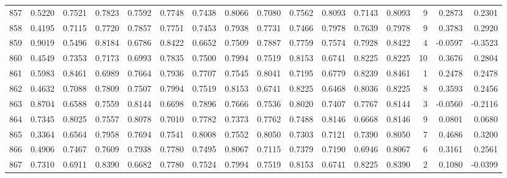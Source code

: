 \begin{tabular}{lrrrrrrrrrrrrrrr}
857 &      0.5220 &  0.7521 &  0.7823 &  0.7592 &  0.7748 &  0.7438 &  0.8066 &  0.7080 &  0.7562 &  0.8093 &   0.7143 &     0.8093 &      9 &                    0.2873 &                     0.2301 \\
858 &      0.4195 &  0.7115 &  0.7720 &  0.7857 &  0.7751 &  0.7453 &  0.7938 &  0.7731 &  0.7466 &  0.7978 &   0.7639 &     0.7978 &      9 &                    0.3783 &                     0.2920 \\
859 &      0.9019 &  0.5496 &  0.8184 &  0.6786 &  0.8422 &  0.6652 &  0.7509 &  0.7887 &  0.7759 &  0.7574 &   0.7928 &     0.8422 &      4 &                   -0.0597 &                    -0.3523 \\
860 &      0.4549 &  0.7353 &  0.7173 &  0.6993 &  0.7835 &  0.7500 &  0.7994 &  0.7519 &  0.8153 &  0.6741 &   0.8225 &     0.8225 &     10 &                    0.3676 &                     0.2804 \\
861 &      0.5983 &  0.8461 &  0.6989 &  0.7664 &  0.7936 &  0.7707 &  0.7545 &  0.8041 &  0.7195 &  0.6779 &   0.8239 &     0.8461 &      1 &                    0.2478 &                     0.2478 \\
862 &      0.4632 &  0.7088 &  0.7809 &  0.7507 &  0.7994 &  0.7519 &  0.8153 &  0.6741 &  0.8225 &  0.6468 &   0.8036 &     0.8225 &      8 &                    0.3593 &                     0.2456 \\
863 &      0.8704 &  0.6588 &  0.7559 &  0.8144 &  0.6698 &  0.7896 &  0.7666 &  0.7536 &  0.8020 &  0.7407 &   0.7767 &     0.8144 &      3 &                   -0.0560 &                    -0.2116 \\
864 &      0.7345 &  0.8025 &  0.7557 &  0.8078 &  0.7010 &  0.7782 &  0.7373 &  0.7762 &  0.7488 &  0.8146 &   0.6668 &     0.8146 &      9 &                    0.0801 &                     0.0680 \\
865 &      0.3364 &  0.6564 &  0.7958 &  0.7694 &  0.7541 &  0.8008 &  0.7552 &  0.8050 &  0.7303 &  0.7121 &   0.7390 &     0.8050 &      7 &                    0.4686 &                     0.3200 \\
866 &      0.4906 &  0.7467 &  0.7609 &  0.7938 &  0.7780 &  0.7495 &  0.8067 &  0.7115 &  0.7379 &  0.7190 &   0.6946 &     0.8067 &      6 &                    0.3161 &                     0.2561 \\
867 &      0.7310 &  0.6911 &  0.8390 &  0.6682 &  0.7780 &  0.7524 &  0.7994 &  0.7519 &  0.8153 &  0.6741 &   0.8225 &     0.8390 &      2 &                    0.1080 &                    -0.0399 \\

\end{tabular}
